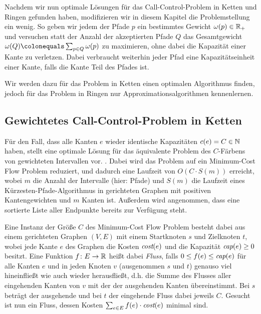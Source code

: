 Nachdem wir nun optimale Lösungen für das Call-Control-Problem in Ketten und Ringen gefunden haben, modifizieren
wir in diesem Kapitel die Problemstellung ein wenig.
So geben wir jedem der Pfade $p$ ein bestimmtes Gewicht $\omega(p) \in \mathbb R_+$ und versuchen statt der
Anzahl der akzeptierten Pfade $Q$ das Gesamtgewicht $\omega(Q) \colonequals \sum_{p\in Q}\omega(p)$ zu maximieren, ohne
dabei die Kapazität einer Kante zu verletzen.
Dabei verbraucht weiterhin jeder Pfad eine Kapazitätseinheit einer Kante, falls die Kante Teil des Pfades ist.

Wir werden dazu für das Problem in Ketten einen optimalen Algorithmus finden, jedoch für das Problem in Ringen
nur Approximationsalgorithmen kennenlernen. 

\subsection{Gewichtetes Call-Control-Problem in Ketten}\label{subsec:weighted-call-control-in-chains}
Für den Fall, dass alle Kanten $e$ wieder identische Kapazitäten $c(e) = C \in \mathbb N$ haben, stellt 
eine optimale Lösung für das äquivalente Problem des $C$-Färbens von gewichteten Intervallen vor. .
Dabei wird das Problem auf ein Minimum-Cost Flow Problem reduziert, und dadurch eine Laufzeit von $O(C\cdot S(m))$
erreicht, wobei $m$ die Anzahl der Intervalle (hier: Pfade) und $S(m)$ die Laufzeit eines Kürzesten-Pfade-Algorithmus
in gerichteten Graphen mit positiven Kantengewichten und $m$ Kanten ist.
Außerdem wird angenommen, dass eine sortierte Liste aller Endpunkte bereits zur Verfügung steht. 

Eine Instanz der Größe $C$ des Minimum-Cost Flow Problem besteht dabei aus einem gerichteten Graphen $(V,E)$ mit
einem Startknoten $s$ und Zielknoten $t$, wobei jede Kante $e$ des Graphen die Kosten $\text{\em cost}(e)$ und die Kapazität
$\text{\em cap}(e) \geq 0$ besitzt.
Eine Funktion $f\colon E \rightarrow \mathbb R$ heißt dabei {\em Fluss}, falls  $0 \leq f(e) \leq \text{\em cap}(e)$ für alle
Kanten $e$ und in jeden Knoten $v$ (ausgenommen $s$ und $t$) genauso viel hineinfließt wie auch wieder herausfließt, d.h.
die Summe des Flusses aller eingehenden Kanten von $v$ mit der der ausgehenden Kanten übereinstimmt.
Bei $s$ beträgt der ausgehende und bei $t$ der eingehende Fluss dabei jeweils $C$.
Gesucht ist nun ein Fluss, dessen Kosten $\sum_{e\in E}f(e) \cdot \text{\em cost}(e)$ minimal sind.

